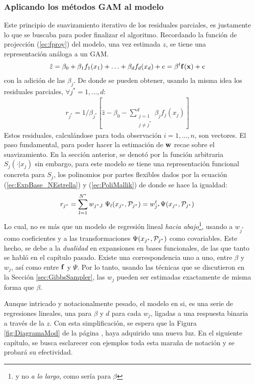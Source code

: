\documentclass[../Main/Main.tex]{subfiles}
\begin{document}
\subsubsection{Aplicando los métodos GAM al modelo}
Este principio de suavizamiento iterativo de los residuales parciales, es justamente lo que se buscaba para poder finalizar el algoritmo.  Recordando la función de projección (\ref{ec:fproy}) del modelo, una vez estimada $z$, se tiene una representación análoga a un GAM.
\begin{align*}
	\hat{z} = \beta_0 + \beta_1f_1(x_1) + \ldots + \beta_df_d(x_d) + e = \beta^t\fsn(\xsn) + e
\end{align*}
con la adición de las $\beta_j$. De donde se pueden obtener, usando la misma idea los residuales parciales, $\forall j^*=1,\ldots,d$:
\begin{align}
r_{j^*} = 1/\beta_{j^*}[\hat{z} - \beta_0 - \sum_{\substack{j=1\\ j \neq j^*}}^d \beta_j f_j(x_j)]
\label{ec:ResParciales3}
\end{align}
Estos residuales, calculándose para toda observación $i = 1,\ldots,n$, son vectores. El paso fundamental, para poder hacer la estimación de $\wsn$ recae sobre el suavizamiento. En la sección anterior, se denotó por la función arbitraria $S_j(\cdot|x_j)$ sin embargo, para este modelo se tiene una representación funcional concreta para $S_j$, los polinomios por partes flexibles dados por la ecuación (\ref{ec:ExpBase_NEstrella}) y (\ref{ec:PoliMallik}) de donde se hace la igualdad:
\begin{equation}
	r_{j^*} = \sum_{l = 1}^{N^*} w_{j^*,l} \; \Psi_l(x_{j^*},\P_{j^*}) = w_{j^*}^t\Psi(x_{j^*},\P_{j^*}) \label{ec:RegResiduales}
\end{equation}
Lo cual, no es más que un modelo de regresión lineal \textit{hacia abajo}\footnote{y no \textit{a lo largo}, como sería para $\beta$}, usando a $w_{j^*}$ como coeficientes y a las transformaciones $\Psi(x_{j^*},\P_{j^*})$ como covariables. Este hecho, se debe a la \textit{dualidad} en expansiones en bases funcionales, de las que tanto se habló en el capítulo pasado. Existe una correspondencia uno a uno, entre $\beta$ y $w_j$, así como entre $\fsn$ y $\Psi$. Por lo tanto, usando las técnicas que se discutieron en la Sección \ref{sec:GibbsSampler}, las $w_j$ pueden ser estimadas exactamente de misma forma que $\beta$.

Aunque intricado y notacionalmente pesado, el modelo en si, es una serie de regresiones lineales, una para $\beta$ y $d$ para cada $w_j$, ligadas a una respuesta binaria a través de la $z$. Con esta simplificación, se espera que la Figura \ref{fig:DiagramaMod} de la página \pageref{fig:DiagramaMod}, haya adquirido una nueva luz. En el siguiente capítulo, se busca esclarecer con ejemplos toda esta maraña de notación y se probará su efectividad.
\end{document}
